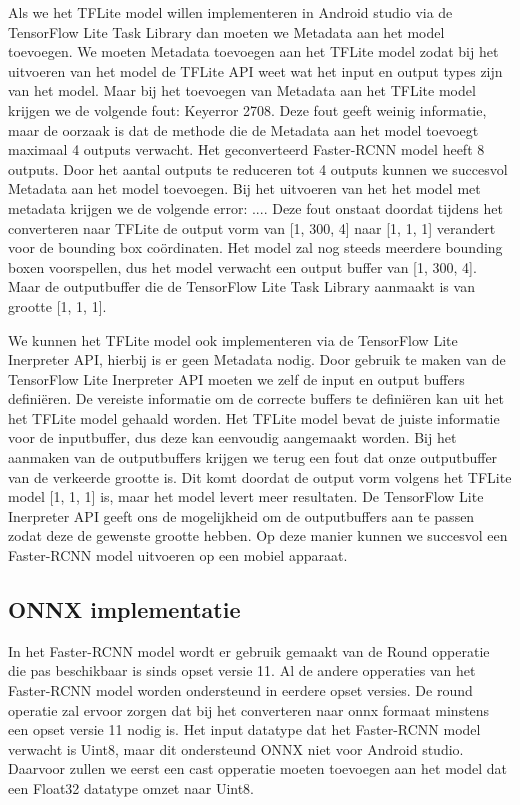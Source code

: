 Als we het TFLite model willen implementeren in Android studio via de TensorFlow Lite Task Library dan moeten we Metadata aan het model toevoegen.
We moeten Metadata toevoegen aan het TFLite model zodat bij het uitvoeren van het model de TFLite API weet wat het input en output types zijn van het model.
Maar bij het toevoegen van Metadata aan het TFLite model krijgen we de volgende fout: Keyerror 2708.
Deze fout geeft weinig informatie, maar de oorzaak is dat de methode die de Metadata aan het model toevoegt maximaal 4 outputs verwacht.
Het geconverteerd Faster-RCNN model heeft 8 outputs.
Door het aantal outputs te reduceren tot 4 outputs kunnen we succesvol Metadata aan het model toevoegen.
Bij het uitvoeren van het het model met metadata krijgen we de volgende error: ....
Deze fout onstaat doordat tijdens het converteren naar TFLite de output vorm van [1, 300, 4] naar [1, 1, 1] verandert voor de bounding box co\"ordinaten.
Het model zal nog steeds meerdere bounding boxen voorspellen, dus het model verwacht een output buffer van [1, 300, 4].
Maar de outputbuffer die de TensorFlow Lite Task Library aanmaakt is van grootte [1, 1, 1].

We kunnen het TFLite model ook implementeren via de TensorFlow Lite Inerpreter API, hierbij is er geen Metadata nodig.
Door gebruik te maken van de TensorFlow Lite Inerpreter API moeten we zelf de input en output buffers defini\"eren.
De vereiste informatie om de correcte buffers te defini\"eren kan uit het het TFLite model gehaald worden.
Het TFLite model bevat de juiste informatie voor de inputbuffer, dus deze kan eenvoudig aangemaakt worden.
Bij het aanmaken van de outputbuffers krijgen we terug een fout dat onze outputbuffer van de verkeerde grootte is.
Dit komt doordat de output vorm volgens het TFLite model [1, 1, 1] is, maar het model levert meer resultaten.
De TensorFlow Lite Inerpreter API geeft ons de mogelijkheid om de outputbuffers aan te passen zodat deze de gewenste grootte hebben.
Op deze manier kunnen we succesvol een Faster-RCNN model uitvoeren op een mobiel apparaat.


\subsection{ONNX implementatie}
In het Faster-RCNN model wordt er gebruik gemaakt van de Round opperatie die pas beschikbaar is sinds opset versie 11.
Al de andere opperaties van het Faster-RCNN model worden ondersteund in eerdere opset versies.
De round operatie zal ervoor zorgen dat bij het converteren naar onnx formaat minstens een opset versie 11 nodig is.
Het input datatype dat het Faster-RCNN model verwacht is Uint8, maar dit ondersteund ONNX niet voor Android studio.
Daarvoor zullen we eerst een cast opperatie moeten toevoegen aan het model dat een Float32 datatype omzet naar Uint8.


